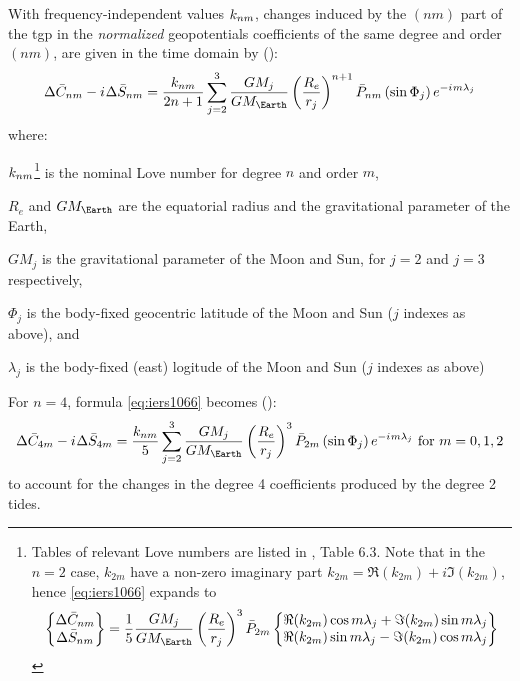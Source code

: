 With frequency-independent values $k _{nm}$, changes induced by the 
$(nm)$ part of the \gls{tgp} in the \emph{normalized} geopotentials 
coefficients of the same degree and order $(nm)$, are given in the time 
domain by (\cite{iers2010}):
\begin{equation}
\Delta \bar{C}_{nm} - \iim \Delta \bar{S}_{nm} = \frac{\lovek _{nm}}{2n+1}
  \sum^{3}_{j=2} \frac{GM_j}{GM_\Earth} \left( \frac{R_e}{r_j} \right) ^{n+1} 
  \bar{P}_{nm} \left( \sin \Phi _j \right) e^{-\iim m \lambda _j}
  \label{eq:iers1066}
\end{equation}
where:
\begin{description}
  \item $k _{nm}$\footnote{Tables of relevant Love numbers are listed 
    in \cite{iers2010}, Table 6.3. Note that in the $n=2$ case, $k_{2m}$ have a 
    non-zero imaginary part $k_{2m} = \Re(k_{2m}) + i\Im(k_{2m})$, hence 
    \ref{eq:iers1066} expands to
    \begin{equation}
      \begin{Bmatrix} \Delta \bar{C}_{nm} \\ \Delta \bar{S}_{nm} \end{Bmatrix}
      = \frac{1}{5} \frac{GM_j}{GM_\Earth} \left( \frac{R_e}{r_j} \right) ^{3} \bar{P}_{2m} 
      \begin{Bmatrix}
        \Re(k_{2m}) \cos{m\lambda _j} + \Im(k_{2m}) \sin{m\lambda _j} \\
        \Re(k_{2m}) \sin{m\lambda _j} - \Im(k_{2m}) \cos{m\lambda _j}
      \end{Bmatrix}
    \end{equation}
    } is the nominal Love number for degree 
    $n$ and order $m$, 
  \item $R_e$ and $GM_{\Earth}$ are the equatorial radius and the 
    gravitational parameter of the Earth,
  \item $GM_j$ is the gravitational parameter of the Moon and Sun, for 
    $j=2$ and $j=3$ respectively,
  \item $\Phi _j$ is the body-fixed geocentric latitude of the Moon and 
    Sun ($j$ indexes as above), and
  \item $\lambda _j$ is the body-fixed (east) logitude of the Moon and 
    Sun ($j$ indexes as above)
\end{description}

For $n=4$, formula \ref{eq:iers1066} becomes (\cite{iers2010}):
\begin{equation}
\Delta \bar{C}_{4m} - \iim \Delta \bar{S}_{4m} = \frac{\lovek _{nm}}{5}
  \sum^{3}_{j=2} \frac{GM_j}{GM_\Earth} \left( \frac{R_e}{r_j} \right) ^{3} 
  \bar{P}_{2m} \left( \sin \Phi _j \right) e^{-\iim m \lambda _j} \text{ for } m=0,1,2
  \label{eq:iers1067}
\end{equation}
to account for the changes in the degree 4 coefficients produced by the 
degree 2 tides.

